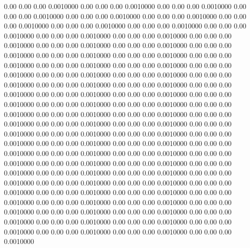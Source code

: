    0.00    0.00    0.00   0.0010000
   0.00    0.00    0.00   0.0010000
   0.00    0.00    0.00   0.0010000
   0.00    0.00    0.00   0.0010000
   0.00    0.00    0.00   0.0010000
   0.00    0.00    0.00   0.0010000
   0.00    0.00    0.00   0.0010000
   0.00    0.00    0.00   0.0010000
   0.00    0.00    0.00   0.0010000
   0.00    0.00    0.00   0.0010000
   0.00    0.00    0.00   0.0010000
   0.00    0.00    0.00   0.0010000
   0.00    0.00    0.00   0.0010000
   0.00    0.00    0.00   0.0010000
   0.00    0.00    0.00   0.0010000
   0.00    0.00    0.00   0.0010000
   0.00    0.00    0.00   0.0010000
   0.00    0.00    0.00   0.0010000
   0.00    0.00    0.00   0.0010000
   0.00    0.00    0.00   0.0010000
   0.00    0.00    0.00   0.0010000
   0.00    0.00    0.00   0.0010000
   0.00    0.00    0.00   0.0010000
   0.00    0.00    0.00   0.0010000
   0.00    0.00    0.00   0.0010000
   0.00    0.00    0.00   0.0010000
   0.00    0.00    0.00   0.0010000
   0.00    0.00    0.00   0.0010000
   0.00    0.00    0.00   0.0010000
   0.00    0.00    0.00   0.0010000
   0.00    0.00    0.00   0.0010000
   0.00    0.00    0.00   0.0010000
   0.00    0.00    0.00   0.0010000
   0.00    0.00    0.00   0.0010000
   0.00    0.00    0.00   0.0010000
   0.00    0.00    0.00   0.0010000
   0.00    0.00    0.00   0.0010000
   0.00    0.00    0.00   0.0010000
   0.00    0.00    0.00   0.0010000
   0.00    0.00    0.00   0.0010000
   0.00    0.00    0.00   0.0010000
   0.00    0.00    0.00   0.0010000
   0.00    0.00    0.00   0.0010000
   0.00    0.00    0.00   0.0010000
   0.00    0.00    0.00   0.0010000
   0.00    0.00    0.00   0.0010000
   0.00    0.00    0.00   0.0010000
   0.00    0.00    0.00   0.0010000
   0.00    0.00    0.00   0.0010000
   0.00    0.00    0.00   0.0010000
   0.00    0.00    0.00   0.0010000
   0.00    0.00    0.00   0.0010000
   0.00    0.00    0.00   0.0010000
   0.00    0.00    0.00   0.0010000
   0.00    0.00    0.00   0.0010000
   0.00    0.00    0.00   0.0010000
   0.00    0.00    0.00   0.0010000
   0.00    0.00    0.00   0.0010000
   0.00    0.00    0.00   0.0010000
   0.00    0.00    0.00   0.0010000
   0.00    0.00    0.00   0.0010000
   0.00    0.00    0.00   0.0010000
   0.00    0.00    0.00   0.0010000
   0.00    0.00    0.00   0.0010000
   0.00    0.00    0.00   0.0010000
   0.00    0.00    0.00   0.0010000
   0.00    0.00    0.00   0.0010000
   0.00    0.00    0.00   0.0010000
   0.00    0.00    0.00   0.0010000
   0.00    0.00    0.00   0.0010000
   0.00    0.00    0.00   0.0010000
   0.00    0.00    0.00   0.0010000
   0.00    0.00    0.00   0.0010000
